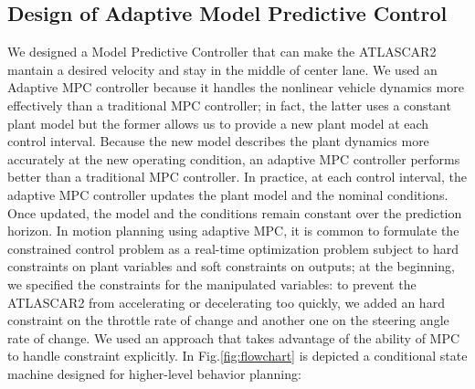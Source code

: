 \documentclass[conference, 11pt]{IEEEtran}
\begin{document}
\subsection{Design of Adaptive Model Predictive Control}
We designed a Model Predictive Controller that can make the ATLASCAR2 mantain a desired velocity and stay in the middle of center lane. We used an Adaptive MPC controller because it handles the nonlinear vehicle dynamics more effectively than a traditional MPC controller; in fact, the latter uses a constant plant model but the former allows us to provide a new plant model at each control interval. Because the new model describes the plant dynamics more accurately at the new operating condition, an adaptive MPC controller performs better than a traditional MPC controller. In practice, at each control interval, the adaptive MPC controller updates the plant model and the nominal conditions. Once updated, the model and the conditions remain constant over the prediction horizon. In motion planning using adaptive MPC, it is common to formulate the constrained control problem as a real-time optimization problem subject to hard constraints on plant variables and soft constraints on outputs; at the beginning, we specified the constraints for the manipulated variables: to prevent the ATLASCAR2 from accelerating or decelerating too quickly, we added an hard constraint on the throttle rate of change and another one on the steering angle rate of change. We used an approach that takes advantage of the ability of MPC to handle constraint explicitly. In Fig.\ref{fig:flowchart} is depicted a conditional state machine designed for higher-level behavior planning:
\end{document}
